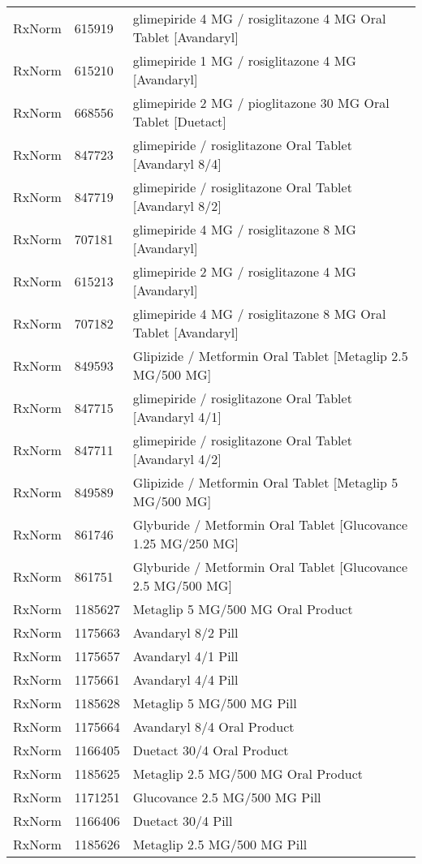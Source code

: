 \begin{longtable}{p{}p{}p{}}
  RxNorm & 615919 & glimepiride 4 MG / rosiglitazone 4 MG Oral Tablet [Avandaryl] \\ 
  RxNorm & 615210 & glimepiride 1 MG / rosiglitazone 4 MG [Avandaryl] \\ 
  RxNorm & 668556 & glimepiride 2 MG / pioglitazone 30 MG Oral Tablet [Duetact] \\ 
  RxNorm & 847723 & glimepiride / rosiglitazone Oral Tablet [Avandaryl 8/4] \\ 
  RxNorm & 847719 & glimepiride / rosiglitazone Oral Tablet [Avandaryl 8/2] \\ 
  RxNorm & 707181 & glimepiride 4 MG / rosiglitazone 8 MG [Avandaryl] \\ 
  RxNorm & 615213 & glimepiride 2 MG / rosiglitazone 4 MG [Avandaryl] \\ 
  RxNorm & 707182 & glimepiride 4 MG / rosiglitazone 8 MG Oral Tablet [Avandaryl] \\ 
  RxNorm & 849593 & Glipizide / Metformin Oral Tablet [Metaglip 2.5 MG/500 MG] \\ 
  RxNorm & 847715 & glimepiride / rosiglitazone Oral Tablet [Avandaryl 4/1] \\ 
  RxNorm & 847711 & glimepiride / rosiglitazone Oral Tablet [Avandaryl 4/2] \\ 
  RxNorm & 849589 & Glipizide / Metformin Oral Tablet [Metaglip 5 MG/500 MG] \\ 
  RxNorm & 861746 & Glyburide / Metformin Oral Tablet [Glucovance 1.25 MG/250 MG] \\ 
  RxNorm & 861751 & Glyburide / Metformin Oral Tablet [Glucovance 2.5 MG/500 MG] \\ 
  RxNorm & 1185627 & Metaglip 5 MG/500 MG Oral Product \\ 
  RxNorm & 1175663 & Avandaryl 8/2 Pill \\ 
  RxNorm & 1175657 & Avandaryl 4/1 Pill \\ 
  RxNorm & 1175661 & Avandaryl 4/4 Pill \\ 
  RxNorm & 1185628 & Metaglip 5 MG/500 MG Pill \\ 
  RxNorm & 1175664 & Avandaryl 8/4 Oral Product \\ 
  RxNorm & 1166405 & Duetact 30/4 Oral Product \\ 
  RxNorm & 1185625 & Metaglip 2.5 MG/500 MG Oral Product \\ 
  RxNorm & 1171251 & Glucovance 2.5 MG/500 MG Pill \\ 
  RxNorm & 1166406 & Duetact 30/4 Pill \\ 
  RxNorm & 1185626 & Metaglip 2.5 MG/500 MG Pill \\ 

\end{longtable}
